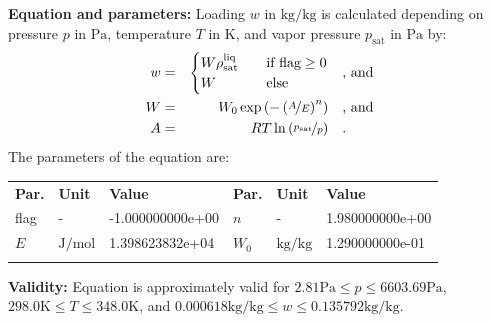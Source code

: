 \textbf{Equation and parameters:}
\newline
%
Loading $w$ in $\si{\kilogram\per\kilogram}$ is calculated depending on pressure $p$ in $\si{\pascal}$, temperature $T$ in $\si{\kelvin}$, and vapor pressure $p_\mathrm{sat}$ in $\si{\pascal}$ by:
%
\begin{equation*}
\begin{split}
w &=& \begin{cases} W \rho_\mathrm{sat}^{\mathrm{liq}} & \quad \text{if flag} \geq 0 \\ W & \quad \text{else} \end{cases} & \quad\text{, and} \\
W &=& W_0 \exp \left( - \left( \nicefrac{A}{E} \right) ^{n} \right) & \quad\text{, and} \\
A &=& R T \ln \left( \nicefrac{p_\mathrm{sat}}{p} \right) & \quad\text{.} \\
\end{split}
\end{equation*}
%
The parameters of the equation are:
%
\begin{longtable}[l]{lll|lll}
\toprule
\addlinespace
\textbf{Par.} & \textbf{Unit} & \textbf{Value} &	\textbf{Par.} & \textbf{Unit} & \textbf{Value} \\
\addlinespace
\midrule
\endhead

\bottomrule
\endfoot
\bottomrule
\endlastfoot
\addlinespace

flag & - & -1.000000000e+00 & $n$ & - & 1.980000000e+00 \\
$E$ & $\si{\joule\per\mole}$ & 1.398623832e+04 & $W_0$ & $\si{\kilogram\per\kilogram}$ & 1.290000000e-01 \\

\addlinespace\end{longtable}

\textbf{Validity:}
\newline
Equation is approximately valid for $2.81 \si{\pascal} \leq p \leq 6603.69 \si{\pascal}$,  $298.0 \si{\kelvin} \leq T \leq 348.0 \si{\kelvin}$, and $0.000618 \si{\kilogram\per\kilogram} \leq w \leq 0.135792 \si{\kilogram\per\kilogram}$.
\newline

